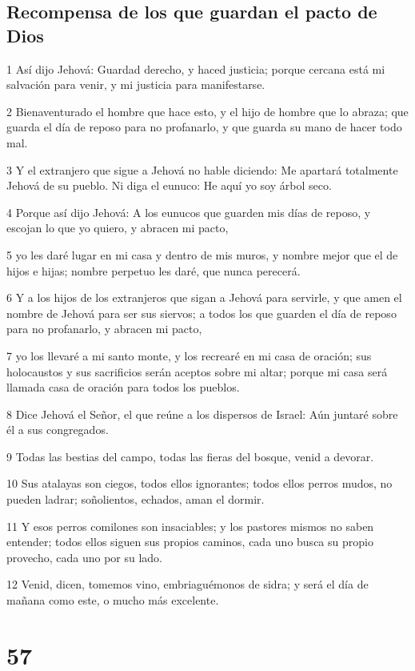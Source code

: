 \section*{Recompensa de los que guardan el pacto de Dios}

\par 1 Así dijo Jehová: Guardad derecho, y haced justicia; porque cercana está mi salvación para venir, y mi justicia para manifestarse.
\par 2 Bienaventurado el hombre que hace esto, y el hijo de hombre que lo abraza; que guarda el día de reposo para no profanarlo, y que guarda su mano de hacer todo mal.
\par 3 Y el extranjero que sigue a Jehová no hable diciendo: Me apartará totalmente Jehová de su pueblo. Ni diga el eunuco: He aquí yo soy árbol seco.
\par 4 Porque así dijo Jehová: A los eunucos que guarden mis días de reposo, y escojan lo que yo quiero, y abracen mi pacto,
\par 5 yo les daré lugar en mi casa y dentro de mis muros, y nombre mejor que el de hijos e hijas; nombre perpetuo les daré, que nunca perecerá.
\par 6 Y a los hijos de los extranjeros que sigan a Jehová para servirle, y que amen el nombre de Jehová para ser sus siervos; a todos los que guarden el día de reposo para no profanarlo, y abracen mi pacto,
\par 7 yo los llevaré a mi santo monte, y los recrearé en mi casa de oración; sus holocaustos y sus sacrificios serán aceptos sobre mi altar; porque mi casa será llamada casa de oración para todos los pueblos. 
\par 8 Dice Jehová el Señor, el que reúne a los dispersos de Israel: Aún juntaré sobre él a sus congregados.
\par 9 Todas las bestias del campo, todas las fieras del bosque, venid a devorar.
\par 10 Sus atalayas son ciegos, todos ellos ignorantes; todos ellos perros mudos, no pueden ladrar; soñolientos, echados, aman el dormir.
\par 11 Y esos perros comilones son insaciables; y los pastores mismos no saben entender; todos ellos siguen sus propios caminos, cada uno busca su propio provecho, cada uno por su lado.
\par 12 Venid, dicen, tomemos vino, embriaguémonos de sidra; y será el día de mañana como este, o mucho más excelente.

\chapter{57}

